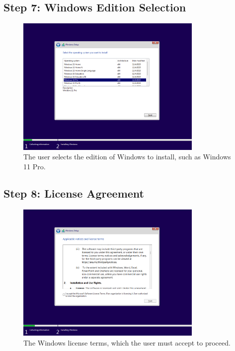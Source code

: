 \documentclass{article}
\begin{document}
\subsection{Step 7: Windows Edition Selection}
\begin{figure}[H]
    \centering
    \includegraphics[width=0.8\textwidth]{2024-09-17_13-53-06.png}
    \caption{The user selects the edition of Windows to install, such as Windows 11 Pro.}
\end{figure}

\subsection{Step 8: License Agreement}
\begin{figure}[H]
    \centering
    \includegraphics[width=0.8\textwidth]{2024-09-17_13-53-17.png}
    \caption{The Windows license terms, which the user must accept to proceed.}
\end{figure}
\end{document}
